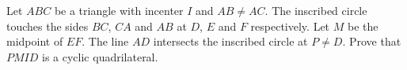 Let $ABC$ be a triangle with incenter $I$ and $AB\neq AC$.
The inscribed circle touches the sides $BC$, $CA$ and $AB$ at $D$, $E$ and $F$ respectively.
Let $M$ be the midpoint of $EF$. The line $AD$ intersects the inscribed circle at $P\neq D$.
Prove that $PMID$ is a cyclic quadrilateral.